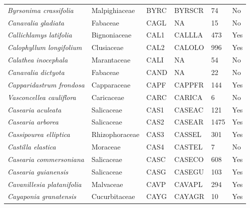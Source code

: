 \documentclass[11pt]{article}
\begin{document}
\begin{longtable}{@{}llllll@{}}
\textit{Byrsonima crassifolia}                        & Malpighiaceae    & BYRC   & BYRSCR & 74              & No        \\
\textit{Canavalia gladiata}                           & Fabaceae         & CAGL   & NA     & 15              & No        \\
\textit{Callichlamys latifolia}                       & Bignoniaceae     & CAL1   & CALLLA & 473             & Yes       \\
\textit{Calophyllum longifolium}                      & Clusiaceae       & CAL2   & CALOLO & 996             & Yes       \\
\textit{Calathea inocephala}                          & Marantaceae      & CALI   & NA     & 54              & No        \\
\textit{Canavalia dictyota}                           & Fabaceae         & CAND   & NA     & 22              & No        \\
\textit{Capparidastrum frondosa}                      & Capparaceae      & CAPF   & CAPPFR & 144             & Yes       \\
\textit{Vasconcellea cauliflora}                      & Caricaceae       & CARC   & CARICA & 6               & No        \\
\textit{Casearia aculeata}                            & Salicaceae       & CAS1   & CASEAC & 121             & Yes       \\
\textit{Casearia arborea}                             & Salicaceae       & CAS2   & CASEAR & 1475            & Yes       \\
\textit{Cassipourea elliptica}                        & Rhizophoraceae   & CAS3   & CASSEL & 301             & Yes       \\
\textit{Castilla elastica}                            & Moraceae         & CAS4   & CASTEL & 7               & No        \\
\textit{Casearia commersoniana}                       & Salicaceae       & CASC   & CASECO & 608             & Yes       \\
\textit{Casearia guianensis}                          & Salicaceae       & CASG   & CASEGU & 103             & Yes       \\
\textit{Cavanillesia platanifolia}                    & Malvaceae        & CAVP   & CAVAPL & 294             & Yes       \\
\textit{Cayaponia granatensis}                        & Cucurbitaceae    & CAYG   & CAYAGR & 10              & Yes       \\

\end{longtable}
\end{document}

